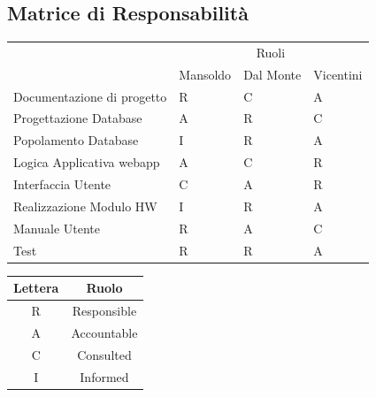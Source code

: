 \documentclass[a4paper,12pt]{article}
\begin{document}
\subsection{Matrice di Responsabilità}
\begin{table}[ht]
\begin{center}
\begin{tabular}{l | l | l | l}
\rowcolor{Ash}
\hline
\multicolumn{1}{ c |}{\multirow{2}{*}{Attività}}      & \multicolumn{3}{c}{Ruoli} \\ \cline{2-4}
\rowcolor{Ash}
  							    & Mansoldo & Dal Monte & Vicentini \\ \hline
 Documentazione di progetto & R & C & A \\ \hline
 Progettazione Database	    & A & R & C \\ \hline
 Popolamento Database	    & I  & R & A \\ \hline
 Logica Applicativa webapp   & A & C & R \\ \hline
 Interfaccia Utente			    & C & A & R \\ \hline
 Realizzazione Modulo HW   & I  & R &  A \\ \hline
 Manuale Utente			    & R & A & C \\ \hline
 Test						    & R & R & A \\ 
\hline
\end{tabular}
\end{center}
\end{table}

\begin{table}[ht]
\begin{center}
\begin{tabular}{c | c}
\rowcolor{Ash}
\hline
Lettera & Ruolo \\ \hline
R & Responsible \\
A & Accountable \\
C & Consulted \\
I  & Informed \\ \hline
\end{tabular}
\end{center}
\end{table}

\pagebreak
\end{document}

